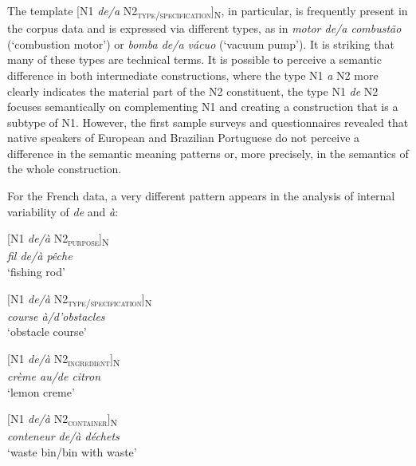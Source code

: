 \documentclass[output=paper]{langsci/langscibook}
\begin{document}
\hspace*{-1.11124pt}The template [N1 \textit{de/a} N2\textsubscript{\scshape type/specification}]\textsubscript{N}, in particular, is frequently present in the corpus data and is expressed via different types, as in \textit{motor de/a combustão} (`combustion motor') or \textit{bomba de/a vácuo} (`vacuum pump'). It is striking that many of these types are technical terms. It is possible to perceive a semantic difference in both intermediate constructions, where the type N1 \textit{a} N2 more clearly indicates the material part of the N2 constituent, the type N1 \textit{de} N2 focuses semantically on complementing N1 and creating a construction that is a subtype of N1. However, the first sample surveys and questionnaires revealed that native speakers of European and Brazilian Portuguese do not perceive a difference in the semantic meaning patterns or, more precisely, in the semantics of the whole construction.

For the French data, a very different pattern appears in the analysis of internal variability of \textit{de} and \textit{à}:

\begin{exe}\ex\begin{minipage}[t]{0.4\textwidth}    %
[N1 \textit{de/à} N2\textsubscript{\scshape purpose}]\textsubscript{N}\\
\textit{fil de/à pêche}\\
`fishing rod'
\end{minipage}\hfill            %
\begin{minipage}[t]{0.45\textwidth}
[N1 \textit{de/à} N2\textsubscript{\scshape type/specification}]\textsubscript{N}\\
\textit{course à/d’obstacles}\\
`obstacle course'
\end{minipage}%
\end{exe}

\begin{exe}\ex\begin{minipage}[t]{0.4\textwidth}
[N1 \textit{de/à} N2\textsubscript{\scshape ingredient}]\textsubscript{N}\\
\textit{crème au/de citron}\\
`lemon creme'
\end{minipage}\hfill\begin{minipage}[t]{0.45\textwidth}
[N1 \textit{de/à} N2\textsubscript{\scshape container}]\textsubscript{N}\\
\textit{conteneur de/à déchets }\\
`waste bin\slash bin with waste'
\end{minipage}%
\end{exe}
\end{document}
